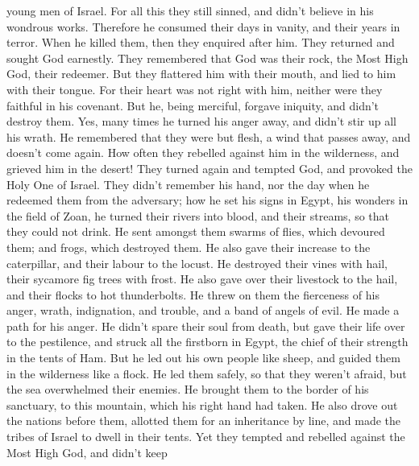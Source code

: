 young men of Israel.  For all this they still sinned, and
didn't believe in his wondrous works.  Therefore he
consumed their days in vanity, and their years in terror.
 When he killed them, then they enquired after him. They
returned and sought God earnestly.  They remembered that
God was their rock, the Most High God, their redeemer. 
But they flattered him with their mouth, and lied to him with their
tongue.  For their heart was not right with him, neither
were they faithful in his covenant.  But he, being
merciful, forgave iniquity, and didn't destroy them. Yes, many times he
turned his anger away, and didn't stir up all his wrath. 
He remembered that they were but flesh, a wind that passes away, and
doesn't come again.  How often they rebelled against him
in the wilderness, and grieved him in the desert!  They
turned again and tempted God, and provoked the Holy One of Israel.
 They didn't remember his hand, nor the day when he
redeemed them from the adversary;  how he set his signs
in Egypt, his wonders in the field of Zoan,  he turned
their rivers into blood, and their streams, so that they could not
drink.  He sent amongst them swarms of flies, which
devoured them; and frogs, which destroyed them.  He also
gave their increase to the caterpillar, and their labour to the locust.
 He destroyed their vines with hail, their sycamore fig
trees with frost.  He also gave over their livestock to
the hail, and their flocks to hot thunderbolts.  He threw
on them the fierceness of his anger, wrath, indignation, and trouble,
and a band of angels of evil.  He made a path for his
anger. He didn't spare their soul from death, but gave their life over
to the pestilence,  and struck all the firstborn in
Egypt, the chief of their strength in the tents of Ham. 
But he led out his own people like sheep, and guided them in the
wilderness like a flock.  He led them safely, so that
they weren't afraid, but the sea overwhelmed their enemies.
 He brought them to the border of his sanctuary, to this
mountain, which his right hand had taken.  He also drove
out the nations before them, allotted them for an inheritance by line,
and made the tribes of Israel to dwell in their tents. 
Yet they tempted and rebelled against the Most High God, and didn't keep
